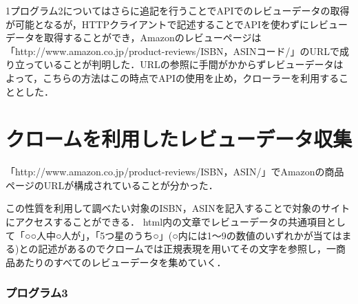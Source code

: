 1プログラム2についてはさらに追記を行うことでAPIでのレビューデータの取得が可能となるが，HTTPクライアントで記述することでAPIを使わずにレビューデータを取得することができ，Amazonのレビューページは「http://www.amazon.co.jp/product-reviews/ISBN，ASINコード/」のURLで成り立っていることが判明した．URLの参照に手間がかからずレビューデータは
よって，こちらの方法はこの時点でAPIの使用を止め，クローラーを利用することとした．


\section{クロームを利用したレビューデータ収集}

「http://www.amazon.co.jp/product-reviews/ISBN，ASIN/」でAmazonの商品ページのURLが構成されていることが分かった．

この性質を利用して調べたい対象のISBN，ASINを記入することで対象のサイトにアクセスすることができる．
html内の文章でレビューデータの共通項目として「○○人中○人が」，「5つ星のうち○」(○内には1～9の数値のいずれかが当てはまる)との記述があるのでクロームでは正規表現を用いてその文字を参照し，一商品あたりのすべてのレビューデータを集めていく．



\subsubsection{プログラム3}

